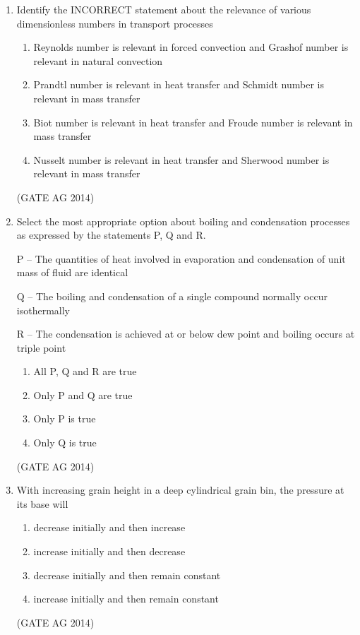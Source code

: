 \documentclass[journal,12pt,onecolumn]{IEEEtran}
\begin{document}
\begin{enumerate}
    \item Identify the INCORRECT statement about the relevance of various dimensionless numbers in transport processes
    \begin{enumerate}
        \item Reynolds number is relevant in forced convection and Grashof number is relevant in natural convection
        \item Prandtl number is relevant in heat transfer and Schmidt number is relevant in mass transfer
        \item Biot number is relevant in heat transfer and Froude number is relevant in mass transfer
        \item Nusselt number is relevant in heat transfer and Sherwood number is relevant in mass transfer
    \end{enumerate}
    \hfill(GATE AG 2014)

    \item Select the most appropriate option about boiling and condensation processes as expressed by the statements P, Q and R.
    
    P – The quantities of heat involved in evaporation and condensation of unit mass of fluid are identical
    
    Q – The boiling and condensation of a single compound normally occur isothermally
    
    R – The condensation is achieved at or below dew point and boiling occurs at triple point
    \begin{multicols}{2}
    \begin{enumerate}
        \item All P, Q and R are true
        \item Only P and Q are true
        \item Only P is true
        \item Only Q is true
    \end{enumerate}
    \end{multicols}
    \hfill(GATE AG 2014)

    \item With increasing grain height in a deep cylindrical grain bin, the pressure at its base will
    \begin{enumerate}
        \item decrease initially and then increase
        \item increase initially and then decrease
        \item decrease initially and then remain constant
        \item increase initially and then remain constant
    \end{enumerate}
    \hfill(GATE AG 2014)


\end{enumerate}
\end{document}
